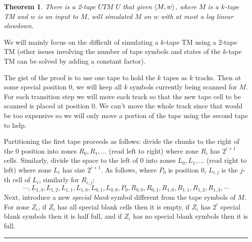 \documentclass[twoside]{article}
\newcounter{lecnum}
\newtheorem{theorem}{Theorem}[lecnum]
\newenvironment{proof}{{\bf Proof:}}{\hfill\rule{2mm}{2mm}}
\DeclarePairedDelimiter\anglebrac{\langle}{\rangle}
\begin{document}
\begin{theorem}
There is a 2-tape $UTM$ $U$ that given $\anglebrac{M, w}$, where $M$ is a $k$-tape TM and $w$ is an input to $M$, will simulated $M$ on $w$ with at most a log linear slowdown. 
\end{theorem}    
\begin{proof}
We will mainly focus on the difficult of simulating a $k$-tape TM using a 2-tape TM (other issues involving the number of tape symbols and states of the $k$-tape TM can be solved by adding a constant factor). 

The gist of the proof is to use one tape to hold the $k$ tapes as $k$ tracks. Then at some special position $0$, we will keep all $k$ symbols currently being scanned for $M$. For each transition step we will move each track so that the new tape cell to be scanned is placed at position $0$. We can't move the whole track since that would be too expensive so we will only move a portion of the tape using the second tape to help. 

Partitioning the first tape proceeds as follows: divide the chunks to the right of the $0$ position into zones $R_0, R_1, ...$ (read left to right) where zone $R_i$ has $2^{i+1}$ cells. Similarly, divide the space to the left of $0$ into zones $L_0, L_1, ...$ (read right to left) where zone $L_i$ has size $2^{i+1}$. As follows, where $P_0$ is position $0$, $L_{i,j}$ is the $j$-th cell of $L_i$, similarly for $R_{i,j}$:
\[\cdots, L_{1,3}, L_{1,2}, L_{1,1}, L_{1,0}, L_{0,1}, L_{0,0}, P_0, R_{0,0}, R_{0,1}, R_{1,0}, R_{1,1}, R_{1,2}, R_{1,3}, \cdots\]
Next, introduce a new \emph{special blank} symbol different from the tape symbols of $M$. For zone $Z_i$, if $Z_i$ has all special blank cells then it is empty, if $Z_i$ has $2^i$ special blank symbols then it is half full, and if $Z_i$ has no special blank symbols then it is full. 


\end{proof}
\end{document}
